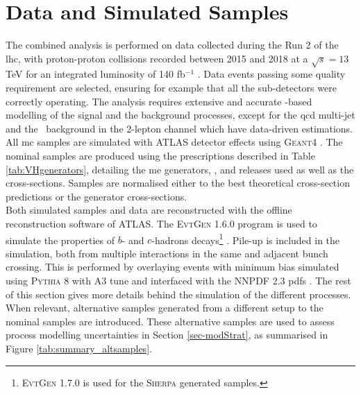 \section{Data and Simulated Samples}\label{sec-datasets} 
The combined analysis is performed on data collected during the Run 2 of the \gls{lhc}, with proton-proton collisions recorded between 2015 and 2018 at a $\sqrt{s} = 13$ TeV for an integrated luminosity of 140 fb$^{-1}$ \cite{ATLAS:2022hro}. Data events passing some quality requirement are selected, ensuring for example that all the sub-detectors were correctly operating. The analysis requires extensive and accurate -based modelling of the signal and the background processes, except for the \gls{qcd} multi-jet and the \ttb\ background in the 2-lepton channel which have data-driven estimations. All \gls{mc} samples are simulated with ATLAS detector effects \cite{ATLASSimulationInfra} using \textsc{Geant4} \cite{Agostinelli:602040}. The nominal samples are produced using the prescriptions described in Table \ref{tab:VHgenerators}, detailing the \gls{me} generators, , and  releases used as well as the cross-sections. Samples are normalised either to the best theoretical cross-section predictions or the generator cross-sections. \\



Both simulated samples and data are reconstructed with the offline reconstruction software of ATLAS. The \textsc{EvtGen} 1.6.0 program is used to simulate the properties of $b$- and $c$-hadrons decays\footnote{\textsc{EvtGen} 1.7.0 is used for the \textsc{Sherpa} generated samples.} \cite{LANGE2001152}. Pile-up is included in the simulation, both from multiple interactions in the same and adjacent bunch crossing. This is performed by overlaying events with minimum bias simulated using \textsc{\textsc{Pythia}} 8 with A3 tune and interfaced with the \textsc{NNPDF} 2.3 \gls{pdf}s \cite{SJOSTRAND2015159}. The rest of this section gives more details behind the simulation of the different processes. When relevant, alternative samples generated from a different setup to the nominal samples are introduced. These alternative samples are used to assess process modelling uncertainties in Section \ref{sec-modStrat}, as summarised in Figure \ref{tab:summary_altsamples}.

